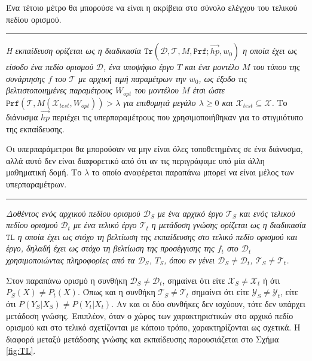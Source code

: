 Ένα τέτοιο μέτρο θα μπορούσε να είναι η ακρίβεια στο σύνολο ελέγχου του τελικού πεδίου ορισμού.
\vspace{1ex}\\
{ \rule{1ex}{1ex} }%
\textit{Η εκπαίδευση ορίζεται ως η διαδικασία $\mathtt{Tr}(\mathcal{D},\mathcal{T},M,\mathtt{Prf}; \vec{hp}, w_0)$ η οποία έχει ως είσοδο ένα πεδίο ορισμού $\mathcal{D}$, ένα υποψήφιο έργο $T$ και ένα μοντέλο $M$ του 
τύπου της συνάρτησης $f$ του $\mathcal{T}$ με αρχική τιμή παραμέτρων την $w_0$, ως έξοδο τις βελτιστοποιημένες παραμέτρους $W_{opt}$ του μοντέλου $ M $ έτσι ώστε $ \mathtt{Prf}\left(\mathcal{T}, M(\mathcal{X}_{test}, W_{opt})\right) > \lambda$ για επιθυμητά μεγάλο $\lambda \geq 0$
και $ \mathcal{X}_{test} \subseteq \mathcal{X} $.} Το διάνυσμα $\vec{hp}$ περιέχει τις υπερπαραμέτρους που χρησιμοποιήθηκαν για το στιγμιότυπο της εκπαίδευσης.

Οι υπερπαράμετροι θα μπορούσαν να μην είναι όλες τοποθετημένες σε ένα διάνυσμα, αλλά αυτό δεν είναι διαφορετικό από ότι αν τις περιγράφαμε υπό μία άλλη μαθηματική δομή. Το $\lambda$ το οποίο αναφέρεται παραπάνω μπορεί να είναι μέλος των υπερπαραμέτρων.
\vspace{1ex}\\
{ \rule{1ex}{1ex} }%
\textit{Δοθέντος ενός αρχικού πεδίου ορισμού $\mathcal{D}_S$ με ένα αρχικό έργο $\mathcal{T}_S$ και ενός τελικού πεδίου ορισμού $\mathcal{D}_t$ με ένα τελικό έργο $\mathcal{T}_t$ η μετάδοση γνώσης ορίζεται ως η διαδικασία $\mathtt{TL}$ η οποία έχει ως στόχο τη βελτίωση της εκπαίδευσης στο τελικό πεδίο ορισμού και έργο, δηλαδή έχει ως στόχο τη βελτίωση της προσέγγισης της $f_t$ στο $\mathcal{D}_t$ χρησιμοποιώντας πληροφορίες από τα $\mathcal{D}_S$, $\mathcal{Τ}_S$, όπου εν γένει $\mathcal{D}_S \neq \mathcal{D}_t$, $\mathcal{T}_S \neq \mathcal{T}_t$.}

Στον παραπάνω ορισμό η συνθήκη $\mathcal{D}_S \neq \mathcal{D}_t$, σημαίνει ότι είτε $\mathcal{X}_S \neq \mathcal{X}_t$ ή ότι $P_{S}(X) \neq P_{t}(X)$. Όπως και η συνθήκη $\mathcal{T}_S \neq \mathcal{T}_t$ σημαίνει ότι είτε $\mathcal{Y}_S \neq \mathcal{Y}_t$, είτε ότι $P(Y_S|X_S) \neq P(Y_t|X_t)$. Αν και οι δύο συνθήκες δεν ισχύουν, τότε δεν υπάρχει μετάδοση γνώσης. Επιπλέον, όταν ο χώρος των χαρακτηριστικών στο αρχικό πεδίο ορισμού και στο τελικό σχετίζονται με κάποιο τρόπο, χαρακτηρίζονται ως σχετικά. Η διαφορά μεταξύ μετάδοσης γνώσης και εκπαίδευσης παρουσιάζεται στο Σχήμα \ref{fig:TL}.


